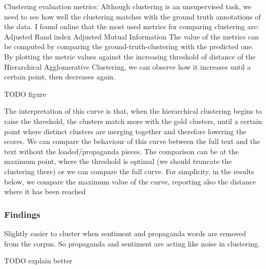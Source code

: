 Clustering evaluation metrics:
Although clustering is an unsupervised task, we need to see how well the clustering matches with the ground truth annotations of the data. I found online that the most used metrics for comparing clustering are:
Adjusted Rand index
Adjusted Mutual Information
The value of the metrics can be computed by comparing the ground-truth-clustering with the predicted one.
By plotting the metric values against the increasing threshold of distance of the Hierarchical Agglomerative Clustering, we can observe how it increases until a certain point, then decreases again.

TODO figure

The interpretation of this curve is that, when the hierarchical clustering begins to raise the threshold, the clusters match more with the gold clusters, until a certain point where distinct clusters are merging together and therefore lowering the scores.
We can compare the behaviour of this curve between the full text and the text without the loaded/propaganda pieces. The comparison can be at the maximum point, where the threshold is optimal (we should truncate the clustering there) or we can compare the full curve. For simplicity, in the results below, we compare the maximum value of the curve, reporting also the distance where it has been reached


\subsubsection{Findings}

Slightly easier to cluster when sentiment and propaganda words are removed from the corpus.
So propaganda and sentiment are acting like noise in clustering.

TODO explain better


